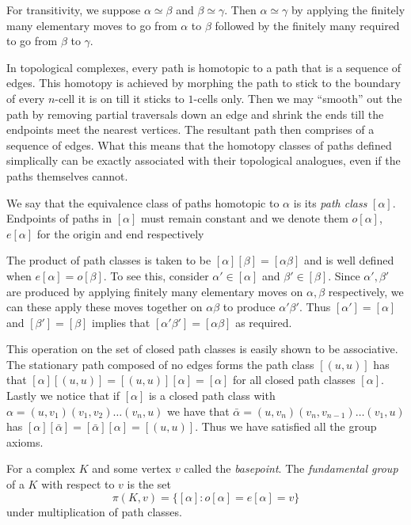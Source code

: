 For transitivity, we suppose $\alpha \simeq \beta$ and $\beta \simeq \gamma$. Then $\alpha \simeq \gamma$ by applying the finitely many elementary moves to go from $\alpha$ to $\beta$ followed by the finitely many required to go from $\beta$ to $\gamma$.

In topological complexes, every path is homotopic to a path that is a sequence of edges. This homotopy is achieved by morphing the path to stick to the boundary of every $n$-cell it is on till it sticks to $1$-cells only. Then we may ``smooth'' out the path by removing partial traversals down an edge and shrink the ends till the endpoints meet the nearest vertices. The resultant path then comprises of a sequence of edges. What this means that the homotopy classes of paths defined simplically can be exactly associated with their topological analogues, even if the paths themselves cannot.

\begin{definition}
  We say that the equivalence class of paths homotopic to $\alpha$ is its \emph{path class} $[\alpha]$. Endpoints of paths in $[\alpha]$ must remain constant and we denote them $o[\alpha]$, $e[\alpha]$ for the origin and end respectively
\end{definition}

The product of path classes is taken to be $[\alpha][\beta] = [\alpha\beta]$ and is well defined when $e[\alpha] = o[\beta]$. To see this, consider $\alpha' \in [\alpha]$ and $\beta' \in [\beta]$. Since $\alpha', \beta'$ are produced by applying finitely many elementary moves on $\alpha,\beta$ respectively, we can these apply these moves together on $\alpha\beta$ to produce $\alpha'\beta'$. Thus $[\alpha'] = [\alpha]$ and $[\beta'] = [\beta]$ implies that $[\alpha'\beta'] = [\alpha\beta]$ as required.

This operation on the set of closed path classes is easily shown to be associative. The stationary path composed of no edges forms the path class $[(u,u)]$ has that $[\alpha][(u,u)] = [(u,u)][\alpha] = [\alpha]$ for all closed path classes $[\alpha]$. Lastly we notice that if $[\alpha]$ is a closed path class with $\alpha=(u,v_1)(v_1,v_2) \dots (v_n,u)$ we have that $\bar{\alpha}=(u,v_n)(v_n,v_{n-1}) \dots (v_1,u)$ has $[\alpha][\bar{\alpha}] = [\bar{\alpha}][\alpha] = [(u,u)]$. Thus we have satisfied all the group axioms.

\begin{definition}
  For a complex $K$ and some vertex $v$ called the \emph{basepoint}. The \emph{fundamental group} of a $K$ with respect to $v$ is the set
  \[
    \pi(K,v) = \{[\alpha]: o[\alpha] = e[\alpha] = v \}
  \]
  under multiplication of path classes.
\end{definition}

